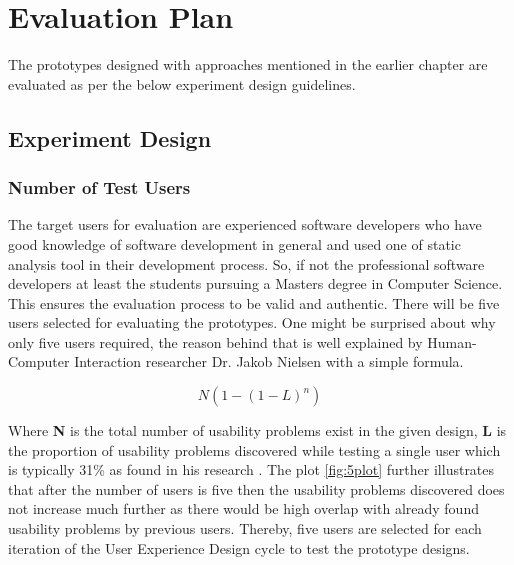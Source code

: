 \chapter{Evaluation Plan}
\label{ch:evaluationplan} 

The prototypes designed with approaches mentioned in the earlier chapter are evaluated as per the below experiment design guidelines. \\

\section{Experiment Design}

\subsection{Number of Test Users}

The target users for evaluation are experienced software developers who have good knowledge of software development in general and used one of static analysis tool in their development process. So, if not the professional software developers at least the students pursuing a Masters degree in Computer Science. This ensures the evaluation process to be valid and authentic. There will be five users selected for evaluating the prototypes. One might be surprised about why only five users required, the reason behind that is well explained by Human-Computer Interaction researcher Dr. Jakob Nielsen with a simple formula\cite{five}.

\[ N (1-(1- L )^n ) \]

Where \textbf{N} is the total number of usability problems exist in the given design, \textbf{L} is the proportion of usability problems discovered while testing a single user which is typically 31\% as found in his research \cite{5users}. The plot \ref{fig:5plot} further illustrates that after the number of users is five then the usability problems discovered does not increase much further as there would be high overlap with already found usability problems by previous users. Thereby, five users are selected for each iteration of the User Experience Design cycle to test the prototype designs. \\ \\

